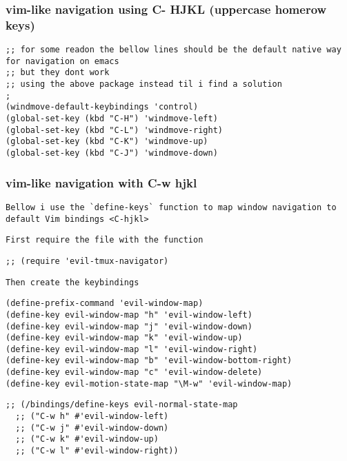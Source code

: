 \documentclass[11pt]{article}
\begin{document}
\subsubsection*{vim-like navigation using C- HJKL (uppercase homerow keys)}
\label{sec:org9706fc9}
\begin{verbatim}
;; for some readon the bellow lines should be the default native way for navigation on emacs
;; but they dont work
;; using the above package instead til i find a solution
;
(windmove-default-keybindings 'control)
(global-set-key (kbd "C-H") 'windmove-left)
(global-set-key (kbd "C-L") 'windmove-right)
(global-set-key (kbd "C-K") 'windmove-up)
(global-set-key (kbd "C-J") 'windmove-down)
\end{verbatim}

\subsubsection*{vim-like navigation with C-w hjkl}
\label{sec:org3e71338}


\begin{verbatim}
Bellow i use the `define-keys` function to map window navigation to default Vim bindings <C-hjkl>
\end{verbatim}


\begin{verbatim}
First require the file with the function
\end{verbatim}


\begin{verbatim}
;; (require 'evil-tmux-navigator)
\end{verbatim}


\begin{verbatim}
Then create the keybindings 
\end{verbatim}

\begin{verbatim}
(define-prefix-command 'evil-window-map)
(define-key evil-window-map "h" 'evil-window-left)
(define-key evil-window-map "j" 'evil-window-down)
(define-key evil-window-map "k" 'evil-window-up)
(define-key evil-window-map "l" 'evil-window-right)
(define-key evil-window-map "b" 'evil-window-bottom-right)
(define-key evil-window-map "c" 'evil-window-delete)
(define-key evil-motion-state-map "\M-w" 'evil-window-map)
\end{verbatim}


\begin{verbatim}
;; (/bindings/define-keys evil-normal-state-map
  ;; ("C-w h" #'evil-window-left)
  ;; ("C-w j" #'evil-window-down)
  ;; ("C-w k" #'evil-window-up)
  ;; ("C-w l" #'evil-window-right))
\end{verbatim}
\end{document}
